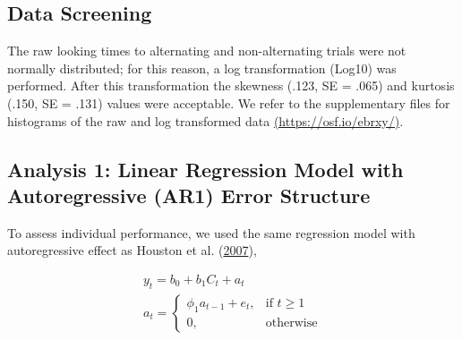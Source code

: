\documentclass[openright,titlepage,12pt,a4paper]{book}
\begin{document}
\newpage

\hypertarget{data-screening}{%
\subsection{Data Screening}\label{data-screening}}

The raw looking times to alternating and non-alternating trials were not normally distributed; for this reason, a log transformation (Log10) was performed. After this transformation the skewness (.123, SE = .065) and kurtosis (.150, SE = .131) values were acceptable. We refer to the supplementary files for histograms of the raw and log transformed data \href{https://osf.io/ebrxy/}{(https://osf.io/ebrxy/)}.

\hypertarget{analysis-1-linear-regression-model-with-autoregressive-ar1-error-structure}{%
\subsection{Analysis 1: Linear Regression Model with Autoregressive (AR1) Error Structure}\label{analysis-1-linear-regression-model-with-autoregressive-ar1-error-structure}}

To assess individual performance, we used the same regression model with autoregressive effect as Houston et al. (\protect\hyperlink{ref-houston_assessing_2007}{2007}),

\begin{equation}
\begin{array}{l}
    y_t = b_0 + b_1 C_t + a_t \\ 
    a_t =
\begin{cases}
    \phi_1 a_{t-1} + e_t,& \text{if } t\geq 1\\
    0,              & \text{otherwise}
\end{cases}
\end{array}
\end{equation}
\end{document}
